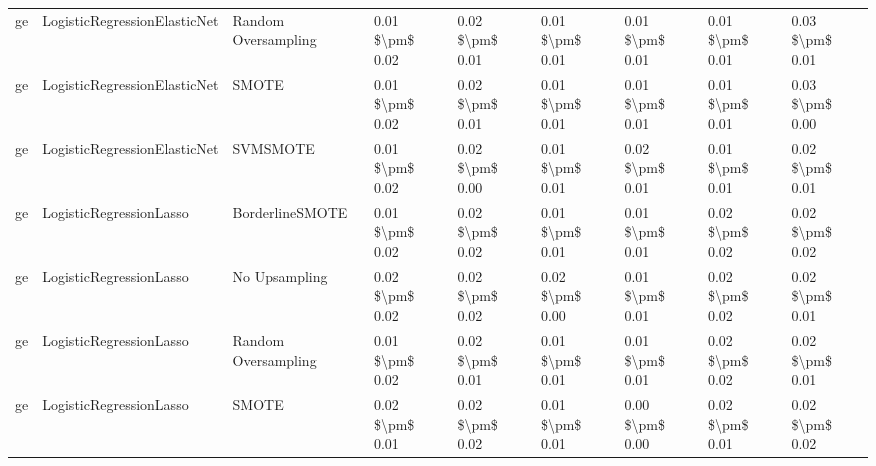 \begin{tabular}{lllllllll}
      ge &    LogisticRegressionElasticNet &           Random Oversampling & 0.01 \$\textbackslash pm\$ 0.02 &           0.02 \$\textbackslash pm\$ 0.01 &       0.01 \$\textbackslash pm\$ 0.01 &        0.01 \$\textbackslash pm\$ 0.01 &                         0.01 \$\textbackslash pm\$ 0.01 &     0.03 \$\textbackslash pm\$ 0.01 \\
      ge &    LogisticRegressionElasticNet &                         SMOTE & 0.01 \$\textbackslash pm\$ 0.02 &           0.02 \$\textbackslash pm\$ 0.01 &       0.01 \$\textbackslash pm\$ 0.01 &        0.01 \$\textbackslash pm\$ 0.01 &                         0.01 \$\textbackslash pm\$ 0.01 &     0.03 \$\textbackslash pm\$ 0.00 \\
      ge &    LogisticRegressionElasticNet &                      SVMSMOTE & 0.01 \$\textbackslash pm\$ 0.02 &           0.02 \$\textbackslash pm\$ 0.00 &       0.01 \$\textbackslash pm\$ 0.01 &        0.02 \$\textbackslash pm\$ 0.01 &                         0.01 \$\textbackslash pm\$ 0.01 &     0.02 \$\textbackslash pm\$ 0.01 \\
      ge &         LogisticRegressionLasso &               BorderlineSMOTE & 0.01 \$\textbackslash pm\$ 0.02 &           0.02 \$\textbackslash pm\$ 0.02 &       0.01 \$\textbackslash pm\$ 0.01 &        0.01 \$\textbackslash pm\$ 0.01 &                         0.02 \$\textbackslash pm\$ 0.02 &     0.02 \$\textbackslash pm\$ 0.02 \\
      ge &         LogisticRegressionLasso &                 No Upsampling & 0.02 \$\textbackslash pm\$ 0.02 &           0.02 \$\textbackslash pm\$ 0.02 &       0.02 \$\textbackslash pm\$ 0.00 &        0.01 \$\textbackslash pm\$ 0.01 &                         0.02 \$\textbackslash pm\$ 0.02 &     0.02 \$\textbackslash pm\$ 0.01 \\
      ge &         LogisticRegressionLasso &           Random Oversampling & 0.01 \$\textbackslash pm\$ 0.02 &           0.02 \$\textbackslash pm\$ 0.01 &       0.01 \$\textbackslash pm\$ 0.01 &        0.01 \$\textbackslash pm\$ 0.01 &                         0.02 \$\textbackslash pm\$ 0.02 &     0.02 \$\textbackslash pm\$ 0.01 \\
      ge &         LogisticRegressionLasso &                         SMOTE & 0.02 \$\textbackslash pm\$ 0.01 &           0.02 \$\textbackslash pm\$ 0.02 &       0.01 \$\textbackslash pm\$ 0.01 &        0.00 \$\textbackslash pm\$ 0.00 &                         0.02 \$\textbackslash pm\$ 0.01 &     0.02 \$\textbackslash pm\$ 0.02 \\

\end{tabular}
